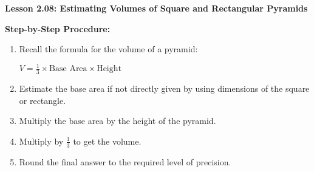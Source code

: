 \begin{center}
\textbf{Lesson 2.08: Estimating Volumes of Square and Rectangular Pyramids}
\end{center}

\vspace*{-1.5ex}

\noindent \textbf{Step-by-Step Procedure:}
\begin{enumerate}
    \item Recall the formula for the volume of a pyramid:

 {\centering $ 
    V = \frac{1}{3} \times \text{Base Area} \times \text{Height}
 $\par}
    \item Estimate the base area if not directly given by using dimensions of the square or rectangle.
    \item Multiply the base area by the height of the pyramid.
    \item Multiply by $\frac{1}{3}$ to get the volume.
    \item Round the final answer to the required level of precision.
\end{enumerate}



